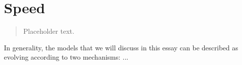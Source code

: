 \section{Speed}

\begin{quote}
{\small Placeholder text. }
\end{quote}

In generality, the models that we will discuss in this essay can be described as evolving according to two mechanisms: ...
